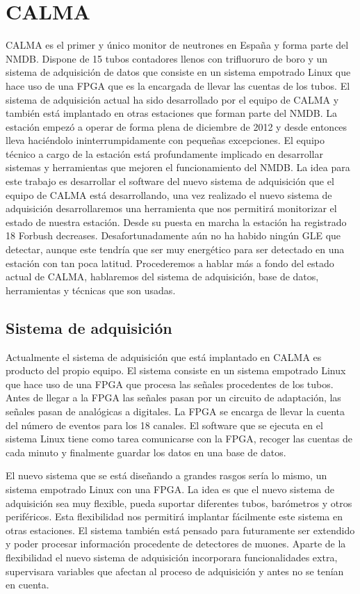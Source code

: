 \section{CALMA}
	CALMA\cite{Medina2013} es el primer y único monitor de neutrones en España y forma parte del NMDB. Dispone de 15 tubos contadores llenos con trifluoruro 
	de boro y un sistema de adquisición de datos que consiste en un sistema empotrado Linux que hace uso de una FPGA que es la encargada de 
	llevar las cuentas de los tubos. El sistema de adquisición actual ha sido desarrollado por el equipo de CALMA y también está implantado en 
	otras estaciones que forman parte del NMDB. La estación empezó a operar de forma plena de diciembre de 2012 y desde entonces lleva haciéndolo 
	ininterrumpidamente con pequeñas excepciones. El equipo técnico a cargo de la estación está profundamente implicado en desarrollar sistemas y herramientas 
	que mejoren el funcionamiento del NMDB. La idea para este trabajo es desarrollar el software del nuevo sistema de adquisición que el equipo 
	de CALMA está desarrollando, una vez realizado el nuevo sistema de adquisición desarrollaremos una herramienta que nos permitirá monitorizar 
	el estado de nuestra estación.
	Desde su puesta en marcha la estación ha registrado 18 Forbush decreases. Desafortunadamente aún no ha habido ningún GLE que detectar, aunque este
	tendría que ser muy energético para ser detectado en una estación con tan poca latitud. 
	Procederemos a hablar más a fondo del estado actual de CALMA, hablaremos del sistema de adquisición, base de datos, herramientas y técnicas
	que son usadas.
	\subsection{Sistema de adquisición}
		Actualmente el sistema de adquisición que está implantado en CALMA es producto del propio equipo\cite{Garcia2014}. El sistema consiste en un sistema empotrado
		Linux que hace uso de una FPGA que procesa las señales procedentes de los tubos. Antes de llegar a la FPGA las señales pasan por un circuito 
		de adaptación, las señales pasan de analógicas a digitales. La FPGA se encarga de llevar la cuenta del número de eventos para los 18 canales. El 
		software que se ejecuta en el sistema Linux tiene como tarea comunicarse con la FPGA, recoger las cuentas de cada minuto y finalmente guardar los
		datos en una base de datos.  
		\par 
		El nuevo sistema que se está diseñando a grandes rasgos sería lo mismo, un sistema empotrado Linux con una FPGA. La idea es que el nuevo sistema
		de adquisición sea muy flexible, pueda suportar diferentes tubos, barómetros y otros periféricos. Esta flexibilidad nos permitirá implantar 
		fácilmente este sistema en otras estaciones. El sistema también está pensado para futuramente ser extendido y poder procesar información 
		procedente de detectores de muones. Aparte de la flexibilidad el nuevo sistema de adquisición incorporara funcionalidades extra, supervisara
		variables que afectan al proceso de adquisición y antes no se tenían en cuenta.
